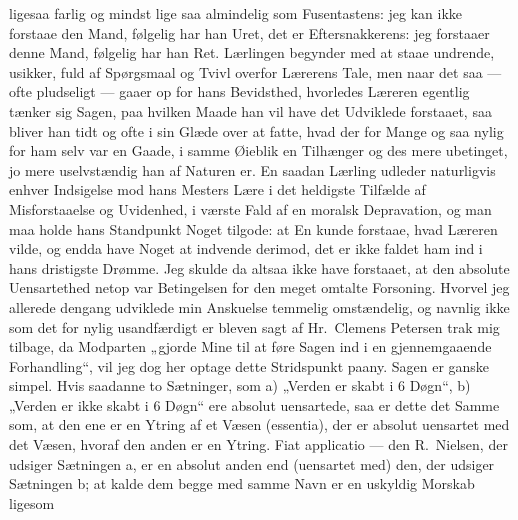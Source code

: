 ligesaa farlig og mindst lige%
saa almindelig som Fusentastens: jeg kan ikke forstaae den Mand,
følgelig har han Uret, det er Eftersnakkerens: jeg forstaaer denne Mand,
følgelig har han Ret. Lærlingen begynder med at staae undrende, usikker, fuld
af Spørgsmaal og Tvivl overfor Lærerens Tale, men naar det saa --- ofte
pludseligt --- gaaer op for hans Bevidsthed, hvorledes Læreren egentlig tænker
sig Sagen, paa hvilken Maade han vil have det Udviklede forstaaet, saa bliver
han tidt og ofte i sin Glæde over at fatte, hvad der for Mange og saa nylig
for ham selv var en Gaade, i samme Øieblik en Tilhænger og des mere ubetinget,
jo mere uselvstændig han af Naturen er. En saadan Lærling udleder naturligvis
enhver Indsigelse mod hans Mesters Lære i det heldigste Tilfælde af
Misforstaaelse og Uvidenhed, i værste Fald af en moralsk Depravation, og man
maa holde hans Standpunkt Noget tilgode: at En kunde forstaae, hvad Læreren
vilde, og endda have Noget at indvende derimod, det er ikke faldet ham ind i
hans dristigste Drømme. Jeg skulde da altsaa ikke have forstaaet, at den
absolute Uensartethed netop var Betingelsen for den meget omtalte Forsoning.
Hvorvel jeg allerede dengang udviklede min Anskuelse temmelig omstændelig, og
navnlig ikke som det for nylig usandfærdigt er bleven sagt af Hr.\ Clemens
Petersen trak mig tilbage, da Modparten „gjorde Mine til at føre Sagen ind i
en gjennemgaaende Forhandling“, vil jeg dog her optage dette Stridspunkt
paany. Sagen er ganske simpel. Hvis saadanne to Sætninger,
som a) „Verden er skabt i 6 Døgn“, b) „Verden er ikke skabt i 6
Døgn“ ere absolut uensartede, saa er dette det Samme som, at den ene er en
Ytring af et Væsen (essentia), der er absolut uensartet med det Væsen, hvoraf
den anden er en Ytring. Fiat applicatio --- den R.\ Nielsen, der udsiger
Sætningen a, er en absolut anden end (uensartet med) den, der udsiger
Sætningen b; at kalde dem begge med samme Navn er en uskyldig Morskab ligesom
